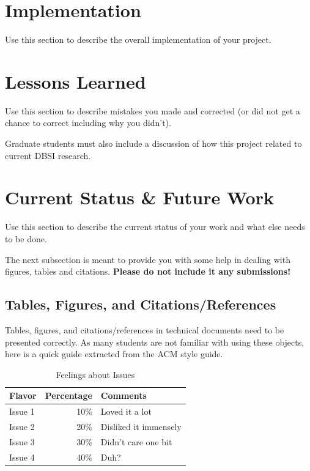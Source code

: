 \documentclass{sig-alternate}
\begin{document}
\section{Implementation}
\label{implementation}

Use this section to describe the overall implementation of your
project.

\section{Lessons Learned}
\label{mistakes}

Use this section to describe mistakes you made and corrected (or did
not get a chance to correct including why you didn't).

Graduate students must also include a discussion of how this project
related to current DBSI research.

\section{Current Status \& Future Work}
\label{current status}

Use this section to describe the current status of your work
and what else needs to be done.

The next subsection is meant to provide you with some help
in dealing with figures, tables and citations. {\bf Please do not
  include it any submissions!}

\subsection{Tables, Figures, and Citations/References}

Tables, figures, and citations/references in technical
documents need to be presented correctly. As many students
are not familiar with using these objects, here is a quick
guide extracted from the ACM style guide.

\begin{table}
\centering
\caption{Feelings about Issues}
\begin{tabular}{|l|r|l|} \hline
Flavor&Percentage&Comments\\ \hline
Issue 1 &  10\% & Loved it a lot\\ \hline
Issue 2 &  20\% & Disliked it immensely\\ \hline
Issue 3 &  30\% & Didn't care one bit\\ \hline
Issue 4 &  40\% & Duh?\\ \hline
\end{tabular}
\end{table}
\end{document}
